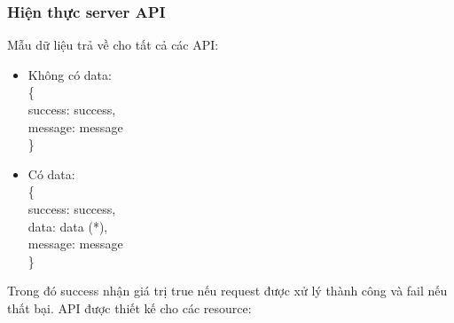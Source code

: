 \documentclass[a4paper,12pt,oneside]{article}
\begin{document}
\subsubsection{Hiện thực server API}

\noindent Mẫu dữ liệu trả về cho tất cả các API:
\begin{itemize}
\item Không có data:\\
\{\\
\indent success: success,\\
\indent message: message\\
\}
\item Có data:\\
\{\\
\indent success: success,\\
\indent data: data (*),\\
\indent message: message\\
\}

\end{itemize}
Trong đó success nhận giá trị true nếu request được xử lý thành công và fail nếu thất bại.
\noindent API được thiết kế cho các resource:
\end{document}
